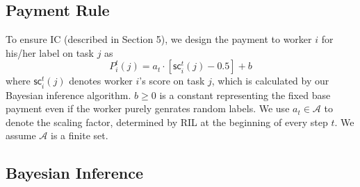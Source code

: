 \subsection{Payment Rule}
\label{payment}
To ensure IC (described in Section 5), we design the payment to worker $i$ for his/her label on task $j$ as
\begin{equation}
P^t_i(j)=a_t \cdot [\textsf{sc}^{t}_i(j)-0.5]+b
\label{equation:payment}
\end{equation}
where $\textsf{sc}^{t}_i(j)$ denotes worker $i$'s score on task $j$, which is calculated by our Bayesian inference algorithm. $b\geq 0$ is a constant representing the fixed base payment even if the worker purely genrates random labels. We use $a_t \in \mathcal{A}$ to denote the scaling factor, determined by RIL at the beginning of every step $t$. We assume $\mathcal{A}$ is a finite set.


\subsection{Bayesian Inference}
\label{inference}


